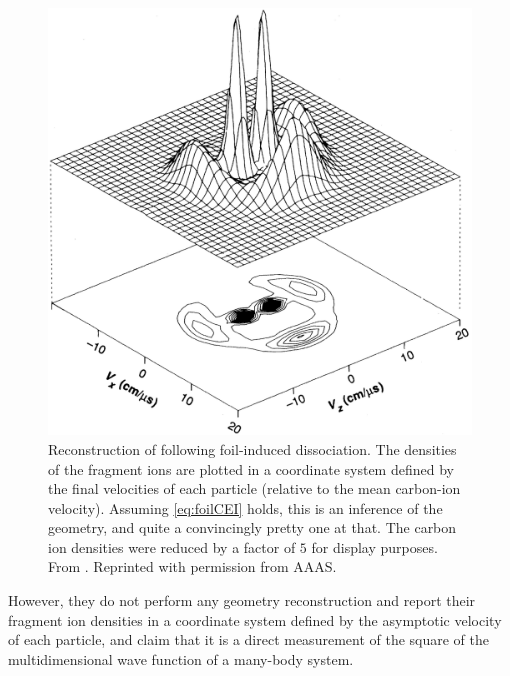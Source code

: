 
\begin{figure}
  \centering
  \includegraphics[width=\textwidth]{gfx/VagerPseudoGeometry}
  \caption[Reconstruction of  following foil-induced dissociation.]
  {Reconstruction of  following foil-induced dissociation. The densities of the fragment ions are plotted in a coordinate system defined by the final velocities of each particle (relative to the mean carbon-ion velocity). Assuming \eqref{eq:foilCEI} holds, this is an inference of the geometry, and quite a convincingly pretty one at that. The carbon ion densities were reduced by a factor of $5$ for display purposes. From \citet{Vager89}. Reprinted with permission from AAAS.}
  \label{fig:C2H3geometry}
\end{figure}

However, they do not perform any geometry reconstruction and report their fragment ion densities in a coordinate system defined by the asymptotic velocity of each particle, and claim that it is a direct measurement of the square of the multidimensional wave function of a many-body system.

